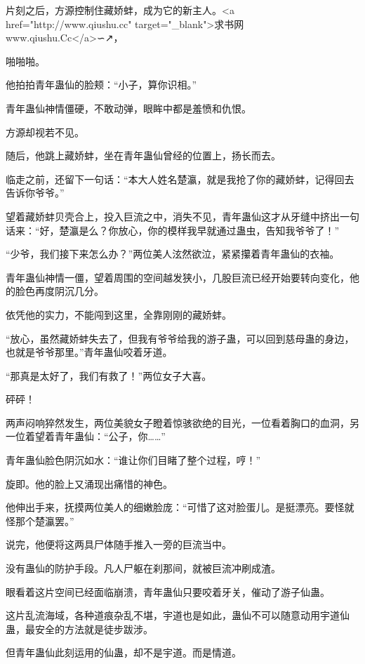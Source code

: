 
\begin{this_body}

片刻之后，方源控制住藏娇蚌，成为它的新主人。<a href="http://www.qiushu.cc" target="\_blank">求书网www.qiushu.Cc</a>∽↗，

啪啪啪。

他拍拍青年蛊仙的脸颊：“小子，算你识相。”

青年蛊仙神情僵硬，不敢动弹，眼眸中都是羞愤和仇恨。

方源却视若不见。

随后，他跳上藏娇蚌，坐在青年蛊仙曾经的位置上，扬长而去。

临走之前，还留下一句话：“本大人姓名楚瀛，就是我抢了你的藏娇蚌，记得回去告诉你爷爷。”

望着藏娇蚌贝壳合上，投入巨流之中，消失不见，青年蛊仙这才从牙缝中挤出一句话来：“好，楚瀛是么？你放心，你的模样我早就通过蛊虫，告知我爷爷了！”

“少爷，我们接下来怎么办？”两位美人泫然欲泣，紧紧攥着青年蛊仙的衣袖。

青年蛊仙神情一僵，望着周围的空间越发狭小，几股巨流已经开始要转向变化，他的脸色再度阴沉几分。

依凭他的实力，不能闯到这里，全靠刚刚的藏娇蚌。

“放心，虽然藏娇蚌失去了，但我有爷爷给我的游子蛊，可以回到慈母蛊的身边，也就是爷爷那里。”青年蛊仙咬着牙道。

“那真是太好了，我们有救了！”两位女子大喜。

砰砰！

两声闷响猝然发生，两位美貌女子瞪着惊骇欲绝的目光，一位看着胸口的血洞，另一位着望着青年蛊仙：“公子，你……”

青年蛊仙脸色阴沉如水：“谁让你们目睹了整个过程，哼！”

旋即。他的脸上又涌现出痛惜的神色。

他伸出手来，抚摸两位美人的细嫩脸庞：“可惜了这对脸蛋儿。是挺漂亮。要怪就怪那个楚瀛罢。”

说完，他便将这两具尸体随手推入一旁的巨流当中。

没有蛊仙的防护手段。凡人尸躯在刹那间，就被巨流冲刷成渣。

眼看着这片空间已经面临崩溃，青年蛊仙只要咬着牙关，催动了游子仙蛊。

这片乱流海域，各种道痕杂乱不堪，宇道也是如此，蛊仙不可以随意动用宇道仙蛊，最安全的方法就是徒步跋涉。

但青年蛊仙此刻运用的仙蛊，却不是宇道。而是情道。


\end{this_body}
